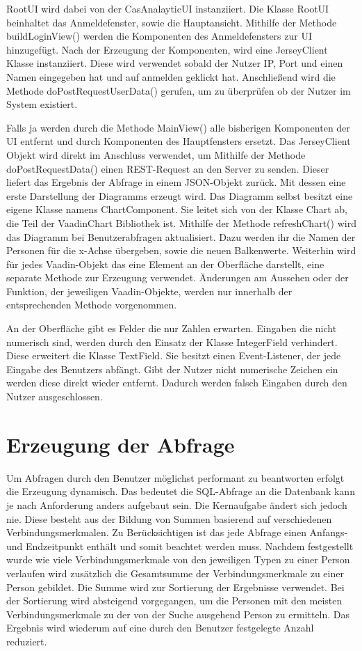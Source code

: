 RootUI wird dabei von der CasAnalayticUI instanziiert. Die Klasse RootUI beinhaltet das Anmeldefenster, sowie die Hauptansicht. Mithilfe der Methode buildLoginView() werden die Komponenten des Anmeldefensters zur UI hinzugefügt. Nach der Erzeugung der Komponenten, wird eine JerseyClient Klasse instanziiert. Diese wird verwendet sobald der Nutzer IP, Port und einen Namen eingegeben hat und auf anmelden geklickt hat. Anschließend wird die Methode doPostRequestUserData() gerufen, um zu überprüfen ob der Nutzer im System existiert. 

Falls ja werden durch die Methode MainView() alle bisherigen Komponenten der UI entfernt und durch Komponenten des Hauptfensters ersetzt. Das JerseyClient Objekt wird direkt im Anschluss verwendet, um Mithilfe der Methode doPostRequestData() einen REST-Request an den Server zu senden. Dieser liefert das Ergebnis der Abfrage in einem JSON-Objekt zurück. Mit dessen eine erste Darstellung der Diagramms erzeugt wird. Das Diagramm selbst besitzt eine eigene Klasse namens ChartComponent. Sie leitet sich von der Klasse Chart ab, die Teil der VaadinChart Bibliothek ist. Mithilfe der Methode refreshChart() wird das Diagramm bei Benutzerabfragen aktualisiert. Dazu werden ihr die Namen der Personen für die x-Achse übergeben, sowie die neuen Balkenwerte. Weiterhin wird für jedes Vaadin-Objekt das eine Element an der Oberfläche darstellt, eine separate Methode zur Erzeugung verwendet. Änderungen am Aussehen oder der Funktion, der jeweiligen Vaadin-Objekte, werden nur innerhalb der entsprechenden Methode vorgenommen.

An der Oberfläche gibt es Felder die nur Zahlen erwarten. Eingaben die nicht numerisch sind, werden durch den Einsatz der Klasse IntegerField verhindert. Diese erweitert die Klasse TextField. Sie besitzt einen Event-Listener, der jede Eingabe des Benutzers abfängt. Gibt der Nutzer nicht numerische Zeichen ein werden diese direkt wieder entfernt. Dadurch werden falsch Eingaben durch den Nutzer ausgeschlossen.

\section{Erzeugung der Abfrage}

Um Abfragen durch den Benutzer möglichst performant zu beantworten erfolgt die Erzeugung dynamisch. Das bedeutet die SQL-Abfrage an die Datenbank kann je nach Anforderung anders aufgebaut sein. Die Kernaufgabe ändert sich jedoch nie. Diese besteht aus der Bildung von Summen basierend auf verschiedenen Verbindungsmerkmalen. Zu Berücksichtigen ist das jede Abfrage einen Anfangs- und Endzeitpunkt enthält und somit beachtet werden muss. Nachdem festgestellt wurde wie viele Verbindungsmerkmale von den jeweiligen Typen zu einer Person verlaufen wird zusätzlich die Gesamtsumme der Verbindungsmerkmale zu einer Person gebildet. Die Summe wird zur Sortierung der Ergebnisse verwendet. Bei der Sortierung wird absteigend vorgegangen, um die Personen mit den meisten Verbindungsmerkmale zu der von der Suche ausgehend Person zu ermitteln. Das Ergebnis wird wiederum auf eine durch den Benutzer festgelegte Anzahl reduziert. 

